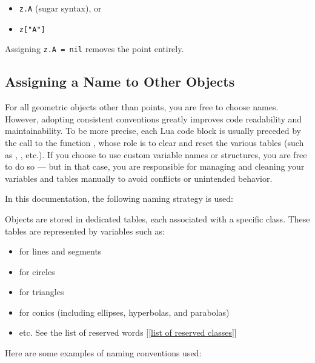 \begin{itemize}
  \item \verb|z.A| (sugar syntax), or
  \item \verb|z["A"]|
\end{itemize}

Assigning \verb|z.A = nil| removes the point entirely.


\subsection{Assigning a Name to Other Objects}
For all geometric objects other than points, you are free to choose names. However, adopting consistent conventions greatly improves code readability and maintainability. To be more precise, each Lua code block is usually preceded by the call to the function , whose role is to clear and reset the various tables (such as , , etc.).
If you choose to use custom variable names or structures, you are free to do so — but in that case, you are responsible for managing and cleaning your variables and tables manually to avoid conflicts or unintended behavior.

In this documentation, the following naming strategy is used:


Objects are stored in dedicated tables, each associated with a specific class.
These tables are represented by variables such as:
\begin{itemize}

\item {} for lines and segments
\item {} for circles
\item {} for triangles
\item  {} for conics (including ellipses, hyperbolas, and parabolas)

\item  etc. See the list of reserved words [\ref{list of reserved classes}]
\end{itemize}

Here are some examples of naming conventions used:

